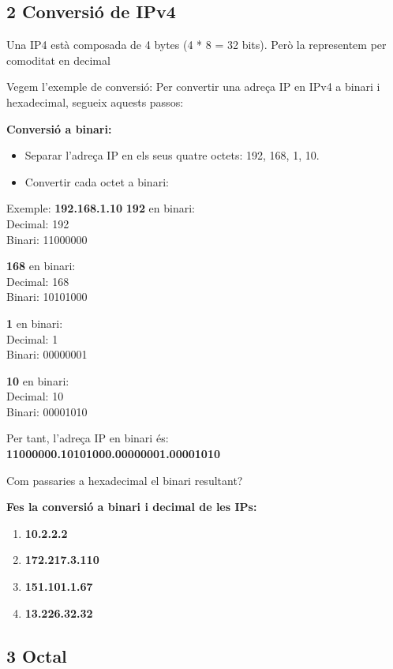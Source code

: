 \documentclass[
  12 pt,
  a4paper,
]{article}
\providecommand{\tightlist}{%
  \setlength{\itemsep}{0pt}\setlength{\parskip}{0pt}}
\begin{document}
\subsection{2 Conversió de IPv4}\label{conversiuxf3-de-ipv4}

Una IP4 està composada de 4 bytes (4 * 8 = 32 bits). Però la representem
per comoditat en decimal

Vegem l'exemple de conversió: Per convertir una adreça IP en IPv4 a
binari i hexadecimal, segueix aquests passos:

\textbf{Conversió a binari:}

\begin{itemize}
\tightlist
\item
  Separar l'adreça IP en els seus quatre octets: 192, 168, 1, 10.
\item
  Convertir cada octet a binari:
\end{itemize}

Exemple: \textbf{192.168.1.10} \textbf{192} en binari:\\
Decimal: 192\\
Binari: 11000000

\textbf{168} en binari:\\
Decimal: 168\\
Binari: 10101000

\textbf{1} en binari:\\
Decimal: 1\\
Binari: 00000001

\textbf{10} en binari:\\
Decimal: 10\\
Binari: 00001010

Per tant, l'adreça IP en binari és:\\
\textbf{11000000.10101000.00000001.00001010}

Com passaries a hexadecimal el binari resultant?

\textbf{Fes la conversió a binari i decimal de les IPs:}

\begin{enumerate}
\def\labelenumi{\arabic{enumi}.}
\item
  \textbf{10.2.2.2}
\item
  \textbf{172.217.3.110}
\item
  \textbf{151.101.1.67}
\item
  \textbf{13.226.32.32}
\end{enumerate}

\subsection{3 Octal}\label{octal}
\end{document}
